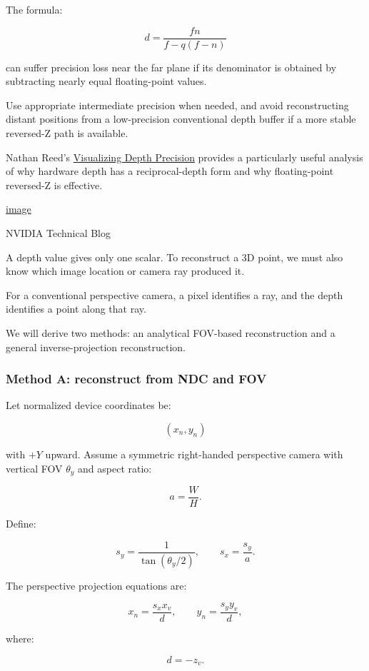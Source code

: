 The formula:

\[ d=\frac{fn}{f-q(f-n)} \]

can suffer precision loss near the far plane if its denominator is obtained by subtracting nearly equal floating-point values.

Use appropriate intermediate precision when needed, and avoid reconstructing distant positions from a low-precision conventional depth buffer if a more stable reversed-Z path is available.

Nathan Reed's \href{https://developer.nvidia.com/blog/visualizing-depth-precision/?utm_source=chatgpt.com}{Visualizing Depth Precision} provides a particularly useful analysis of why hardware depth has a reciprocal-depth form and why floating-point reversed-Z is effective. 

\href{https://www.google.com/s2/favicons?domain=https://developer.nvidia.com&sz=32}{image}

NVIDIA Technical Blog

A depth value gives only one scalar. To reconstruct a 3D point, we must also know which image location or camera ray produced it.

For a conventional perspective camera, a pixel identifies a ray, and the depth identifies a point along that ray.

We will derive two methods: an analytical FOV-based reconstruction and a general inverse-projection reconstruction.

\subsubsection{Method A: reconstruct from NDC and FOV}\label{method-a-reconstruct-from-ndc-and-fov}

Let normalized device coordinates be:

\[ (x_n,y_n) \]

with \(+Y\) upward. Assume a symmetric right-handed perspective camera with vertical FOV \(\theta_y\) and aspect ratio:

\[ a=\frac WH. \]

Define:

\[ s_y=\frac1{\tan(\theta_y/2)}, \qquad s_x=\frac{s_y}{a}. \]

The perspective projection equations are:

\[ x_n=\frac{s_xx_v}{d}, \qquad y_n=\frac{s_yy_v}{d}, \]

where:

\[ d=-z_v. \]


